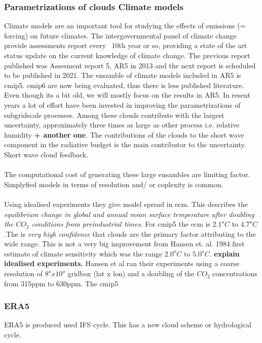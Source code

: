\subsubsection{Parametrizations of clouds Climate models} \label{sec:climate_models}
Climate models are an important tool for studying the effects of emissions (= forcing) on future climates. The intergovernmental panel of climate change provide assessments report every ~10th year or so, providing a state of the art status update on the current knowledge of climate change. The previous report published was Assesment report 5, AR5 in 2013 and the next report is scheduled to be published in 2021. The ensamble of climate models included in AR5 is \acrfull{cmip5}. \acrshort{cmip6} are now being evaluated, thus there is less published literature. Even though its a bit old, we will mostly focus on the results in AR5. In resent years a lot of effort have been invested in improving the parametrizations of subgridscale processes. Among these clouds contribute with the largest uncertainty, approximately three times as large as other process i.e. relative humidity\textbf{ + another one}. The contributions of the clouds to the short wave component in the radiative budget is the main contributor to the uncertainty. Short wave cloud feedback. 
\\ \\
The computational cost of generating these large ensambles are limiting factor. Simplyfied models in terms of resolution and/ or coplexity is common. 
\\ \\ 
Using idealised experiments they give model spread in \acrfull{ecm}. This describes the \textit{equilibrium change in global and annual mean surface temperature after doubling the $CO_2$ conditions from preindustrial times.}
For \acrshort{cmip5} the \acrshort{ecm} is $2.1^oC$ to $4.7^oC$.The is \textit{very high confidence} that clouds are the primary factor attributing to the wide range. This is not a very big improvement from Hansen et. al. 1984 first estimate of climate sensitivity which was the range $2.0^oC$ to $5.0^oC$. \textbf{explain idealised experiments.} Hansen et al ran their experiments using a coarse resolution of $8^ox10^o$ gridbox (lat x lon) and a doubling of the $CO_2$ concentrations from 315ppm to 630ppm. The \acrshort{cmip5} 

\subsubsection{ERA5} \label{sec:paramERA5}
ERA5 is produced used IFS cycle. This has a new cloud scheme or hydrological cycle. 


